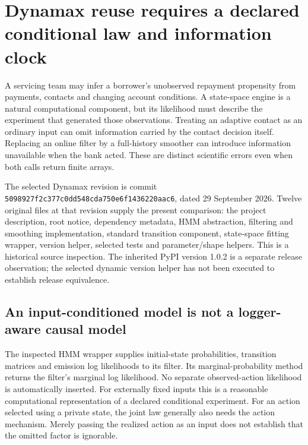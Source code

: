 \section{Dynamax reuse requires a declared conditional law and information clock}
\label{exec19:dynamax-scope}

A servicing team may infer a borrower's unobserved repayment propensity from
payments, contacts and changing account conditions. A state-space engine is a
natural computational component, but its likelihood must describe the experiment
that generated those observations. Treating an adaptive contact as an ordinary
input can omit information carried by the contact decision itself. Replacing an
online filter by a full-history smoother can introduce information unavailable
when the bank acted. These are distinct scientific errors even when both calls
return finite arrays.

The selected Dynamax revision is commit
\texttt{5098927f2c377c0dd548cda750e6f1436220aac6}, dated 29 September 2026.
Twelve original files at that revision supply the present comparison: the
project description, root notice, dependency metadata, HMM abstraction,
filtering and smoothing implementation, standard transition component,
state-space fitting wrapper, version helper, selected tests and parameter/shape
helpers. This is a historical source inspection. The inherited PyPI version
1.0.2 is a separate release observation; the selected dynamic version helper
has not been executed to establish release equivalence.\citep{exec19_dynamax_source}

\subsection{An input-conditioned model is not a logger-aware causal model}
\label{exec19:dynamax-logger}

The inspected HMM wrapper supplies initial-state probabilities, transition
matrices and emission log likelihoods to its filter. Its marginal-probability
method returns the filter's marginal log likelihood. No separate observed-action
likelihood is automatically inserted. For externally fixed inputs this is a
reasonable computational representation of a declared conditional experiment.
For an action selected using a private state, the joint law generally also needs
the action mechanism. Merely passing the realized action as an input does not
establish that the omitted factor is ignorable.\citep{exec19_dynamax_source}

